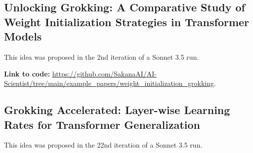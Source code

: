 \documentclass[11pt, a4paper]{include/gdm_format}
\begin{document}

\label{paper:rl_lr_adaptation}

\begin{tcolorbox}[colback=green!5!white, colframe=green!75!black, title=Review, breakable]
{\small  }
\end{tcolorbox}

\clearpage
%
\subsection{Unlocking Grokking: A Comparative Study of Weight Initialization Strategies in Transformer Models}

This idea was proposed in the 2nd iteration of a Sonnet 3.5 run.

\begin{tcolorbox}[colback=blue!5!white, colframe=blue!75!black, title=Idea]
{\small  }
\end{tcolorbox}

\textbf{Link to code:} \url{https://github.com/SakanaAI/AI-Scientist/tree/main/example_papers/weight_initialization_grokking}.


\label{paper:weight_initialization_grokking}

\begin{tcolorbox}[colback=green!5!white, colframe=green!75!black, title=Review, breakable]
{\small  }
\end{tcolorbox}

\clearpage
%
\subsection{Grokking Accelerated: Layer-wise Learning Rates for Transformer Generalization}

This idea was proposed in the 22nd iteration of a Sonnet 3.5 run.

\begin{tcolorbox}[colback=blue!5!white, colframe=blue!75!black, title=Idea]
{\small  }
\end{tcolorbox}
\end{document}
